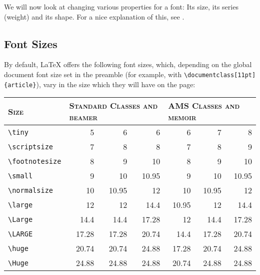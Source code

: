 \documentclass[a4paper,oneside,11pt]{article}
\newcommand\comm[1]{\texttt{\textbackslash#1}}
\newcommand\code[1]{\texttt{#1}}
\begin{document}
We  will  now look  at  changing  various  properties  for a  font: Its  size,
its  series (weight)  and  its  shape. For a  nice  explanation  of this,  see
\cite{stackexch:bfseries-textbf}.


\subsection{Font Sizes}
\label{subsec:font-sizes}

By  default, \LaTeX{}  offers the  following font  sizes, which,  depending on
the  global  document  font  size  set in  the  preamble  (for  example,  with
\code{\textbackslash{}documentclass[11pt]\{article\}}), vary in the size which
they will have on the page:

\begin{center}
    \begin{tabular}{lrrrrrr}
        \toprule
        \textsc{Size} &
        \multicolumn{3}{l}{\textsc{Standard Classes and beamer}} &
        \multicolumn{3}{l}{\textsc{AMS Classes and memoir}} \\
        \midrule
        \comm{tiny}         &  5    &  6     & 6     & 6     & 7     & 8     \\
        \comm{scriptsize}   &  7    &  8     & 8     & 7     & 8     & 9     \\
        \comm{footnotesize} &  8    &  9     & 10    & 8     & 9     & 10    \\
        \comm{small}        &  9    &  10    & 10.95 & 9     & 10    & 10.95 \\
        \comm{normalsize}   & 10    &  10.95 & 12    & 10    & 10.95 & 12    \\
        \comm{large}        & 12    &  12    & 14.4  & 10.95 & 12    & 14.4  \\
        \comm{Large}        & 14.4  &  14.4  & 17.28 & 12    & 14.4  & 17.28 \\
        \comm{LARGE}        & 17.28 &  17.28 & 20.74 & 14.4  & 17.28 & 20.74 \\
        \comm{huge}         & 20.74 &  20.74 & 24.88 & 17.28 & 20.74 & 24.88 \\
        \comm{Huge}         & 24.88 &  24.88 & 24.88 & 20.74 & 24.88 & 24.88 \\
        \bottomrule
    \end{tabular}
\end{center}
\end{document}
